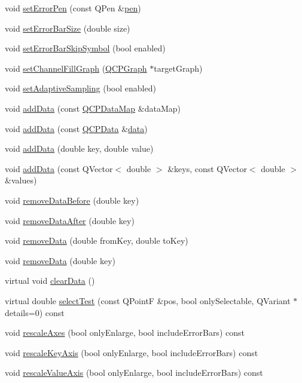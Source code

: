 \begin{DoxyCompactItemize}
\item 
void \hyperlink{class_q_c_p_graph_abd4c7f81939e10776ea64603a704f22a}{set\+Error\+Pen} (const Q\+Pen \&\hyperlink{class_q_c_p_abstract_plottable_a41d060007cc6b3037c9c04d22d0c0398}{pen})
\item 
void \hyperlink{class_q_c_p_graph_a10f50c5495ce45ef559ec2066194a335}{set\+Error\+Bar\+Size} (double size)
\item 
void \hyperlink{class_q_c_p_graph_ab1c1ee03d8dd94676a564e5e5f11aac2}{set\+Error\+Bar\+Skip\+Symbol} (bool enabled)
\item 
void \hyperlink{class_q_c_p_graph_a2d03156df1b64037a2e36cfa50351ca3}{set\+Channel\+Fill\+Graph} (\hyperlink{class_q_c_p_graph}{Q\+C\+P\+Graph} $\ast$target\+Graph)
\item 
void \hyperlink{class_q_c_p_graph_ab468cd600160f327836aa0644291e64c}{set\+Adaptive\+Sampling} (bool enabled)
\item 
void \hyperlink{class_q_c_p_graph_aa5c6181d84db72ce4dbe9dc15a34ef4f}{add\+Data} (const \hyperlink{qcustomplot_8h_a84a9c4a4c2216ccfdcb5f3067cda76e3}{Q\+C\+P\+Data\+Map} \&data\+Map)
\item 
void \hyperlink{class_q_c_p_graph_a80cc91e1e0ef77eb50afc5b366d0efd9}{add\+Data} (const \hyperlink{class_q_c_p_data}{Q\+C\+P\+Data} \&\hyperlink{class_q_c_p_graph_a2f58436df4f86a2792b776a21642b3d9}{data})
\item 
void \hyperlink{class_q_c_p_graph_a0bf98b1972286cfb7b1c4b7dd6ae2012}{add\+Data} (double key, double value)
\item 
void \hyperlink{class_q_c_p_graph_ab6da6377541fe80d892a9893a92db9c6}{add\+Data} (const Q\+Vector$<$ double $>$ \&keys, const Q\+Vector$<$ double $>$ \&values)
\item 
void \hyperlink{class_q_c_p_graph_a9fe0b3e54e8c7b61319bd03337e21e99}{remove\+Data\+Before} (double key)
\item 
void \hyperlink{class_q_c_p_graph_ae42d645ef617cfc75fc0df58e62c522a}{remove\+Data\+After} (double key)
\item 
void \hyperlink{class_q_c_p_graph_a4a0fde50b7db9db0a85b5c5b6b10098f}{remove\+Data} (double from\+Key, double to\+Key)
\item 
void \hyperlink{class_q_c_p_graph_a4a706020b4318f118381648ef18aca3f}{remove\+Data} (double key)
\item 
virtual void \hyperlink{class_q_c_p_graph_ad4e94a4e44e5e76fbec81a72a977157d}{clear\+Data} ()
\item 
virtual double \hyperlink{class_q_c_p_graph_abc9ff375aabcf2d21cca33d6baf85772}{select\+Test} (const Q\+Point\+F \&pos, bool only\+Selectable, Q\+Variant $\ast$details=0) const 
\item 
void \hyperlink{class_q_c_p_graph_aa35b75b9032800d783df749c8a004ee9}{rescale\+Axes} (bool only\+Enlarge, bool include\+Error\+Bars) const 
\item 
void \hyperlink{class_q_c_p_graph_a2108a729046b0ab6e0516afb249dab13}{rescale\+Key\+Axis} (bool only\+Enlarge, bool include\+Error\+Bars) const 
\item 
void \hyperlink{class_q_c_p_graph_a2ba0e1df416486d7e74299ef8cf68bba}{rescale\+Value\+Axis} (bool only\+Enlarge, bool include\+Error\+Bars) const 
\end{DoxyCompactItemize}
